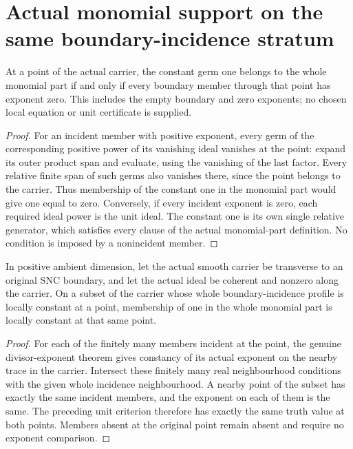 \section{Actual monomial support on the same boundary-incidence stratum}

\begin{lemma}
\label{hir:sharp-actual-monomial-unit-incidence}
\leanok
At a point of the actual carrier, the constant germ one belongs to the
whole monomial part if and only if every boundary member through that
point has exponent zero. This includes the empty boundary and zero
exponents; no chosen local equation or unit certificate is supplied.
\end{lemma}
\begin{proof}
For an incident member with positive exponent, every germ of the
corresponding positive power of its vanishing ideal vanishes at the
point: expand its outer product span and evaluate, using the vanishing
of the last factor. Every relative finite span of such germs also
vanishes there, since the point belongs to the carrier. Thus membership
of the constant one in the monomial part would give one equal to zero.
Conversely, if every incident exponent is zero, each required ideal
power is the unit ideal. The constant one is its own single relative
generator, which satisfies every clause of the actual monomial-part
definition. No condition is imposed by a nonincident member.
\end{proof}

\begin{theorem}
\label{hir:sharp-actual-monomial-unit-stable-boundary-stratum}
\leanok
In positive ambient dimension, let the actual smooth carrier be transverse to an original SNC boundary,
and let the actual ideal be coherent and nonzero along the carrier.
On a subset of the carrier whose whole boundary-incidence profile is
locally constant at a point, membership of one in the whole monomial
part is locally constant at that same point.
\end{theorem}
\begin{proof}
For each of the finitely many members incident at the point, the
genuine divisor-exponent theorem gives constancy of its actual exponent
on the nearby trace in the carrier. Intersect these finitely many real
neighbourhood conditions with the given whole incidence neighbourhood.
A nearby point of the subset has exactly the same incident members,
and the exponent on each of them is the same. The preceding unit
criterion therefore has exactly the same truth value at both points.
Members absent at the original point remain absent and require no
exponent comparison.
\end{proof}


